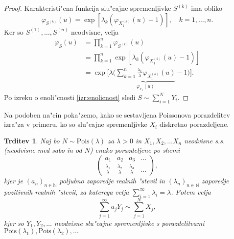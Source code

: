 \documentclass[12pt, a4paper, reqno]{amsart}
\theoremstyle{definition}
\theoremstyle{plain}
\newtheorem{trditev}[definicija]{Trditev}
\newcommand{\N}{\mathbb{N}}
\newcommand{\1}{\mathds{1}}
\newcommand{\Pois}[1]{\text{Pois}(#1)}
\newcommand*{\refPriloga}[1]{%
  \begingroup
    \hypersetup{
      linkcolor=red,
      linkbordercolor=red,
    }%
    \ref{#1}%
  \endgroup
}
\begin{document}
    \begin{proof}
        Karakteristi"cna funkcija slu"cajne spremenljivke $S^{(k)}$ ima obliko
        \begin{equation*}
            \varphi_{S^{(k)}}(u) = \exp\left[\lambda_k\left(\varphi_{X_1^{(k)}}(u) - 1\right)\right], \quad k=1, \dots, n.
        \end{equation*}
        Ker so $S^{(1)}, \dots, S^{(n)}$ neodvisne, velja
        \begin{align*}
            \varphi_{S}(u) 
                &= \prod_{k=1}^n\varphi_{S^{(k)}}(u) \\
                &= \prod_{k=1}^n\exp\left[\lambda_k\left(\varphi_{X_1^{(k)}}(u) - 1\right)\right] \\
                &= \exp\Biggl[\lambda\Biggl(\underbrace{\sum_{k=1}^n \frac{\lambda_k}{\lambda} \varphi_{X_1^{(k)}}(u)}_{\varphi_{Y_1}(u)} - 1\Biggr)\Biggr].
        \end{align*}
        Po izreku o 
        enoli"cnosti \refPriloga{izr:enolicnost} sledi $S\sim\sum_{i=1}^{N}Y_i$.
    \end{proof}

    Na podoben na"cin poka"zemo, kako se sestavljena Poissonova porazdelitev izra"za v primeru, ko so
    slu"cajne spremenljivke $X_i$ diskretno porazdeljene.

    \begin{trditev}
        Naj bo $N\sim \Pois{\lambda}$  za $\lambda >0$ in $X_1, X_2, \dots X_n$ neodvisne s.s. (neodvisne 
        med sabo in od $N$) enako porazdeljene po shemi
        $$ 
        \begin{pmatrix}
            a_1 & a_2 & a_3 &  \dots  \\
            \tfrac{\lambda_1}{\lambda} & \tfrac{\lambda_2}{\lambda} & \tfrac{\lambda_3}{\lambda} & \dots 
        \end{pmatrix},
        $$
        kjer je $(a_n)_{n\in\N}$ poljubno zaporedje realnih "stevil in 
        $(\lambda_n)_{n\in\N}$ zaporedje pozitivnih realnih "stevil, za katerega velja 
        ${\sum_{i=1}^\infty\lambda_i = \lambda}$.
        Potem velja 
        \begin{equation*}
            \sum_{j=1}^\infty a_jY_j \sim \sum_{j=1}^NX_j,
        \end{equation*}
        kjer so $Y_1,Y_2,  \dots$ neodvisne slu"cajne spremenljivke s porazdelitvami \\
        $\Pois{\lambda_1},\Pois{\lambda_2}, \dots$
        \label{trd:NXjeEnakoaY}
    \end{trditev}
\end{document}
